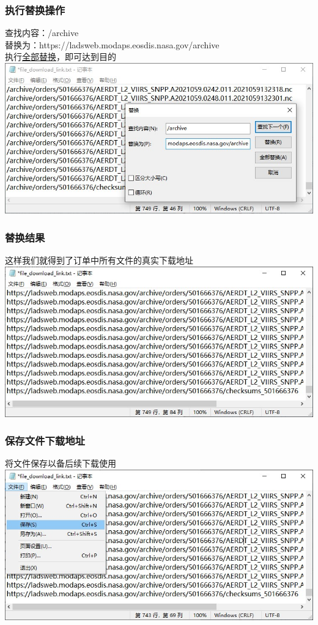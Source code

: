 \begin{frame}
    \frametitle{执行替换操作}
    查找内容：/archive\\
    替换为：https://ladsweb.modaps.eosdis.nasa.gov/archive \\
    执行\underline{全部替换}，即可达到目的
    \includegraphics[width=\linewidth]{images/29.替换项目}
\end{frame}
\begin{frame}
    \frametitle{替换结果}
    这样我们就得到了订单中所有文件的真实下载地址
    \includegraphics[width=\linewidth]{images/30.替换结果}
\end{frame}
\begin{frame}
    \frametitle{保存文件下载地址}
    将文件保存以备后续下载使用
    \includegraphics[width=\linewidth]{images/31.保存替换结果}
\end{frame}
